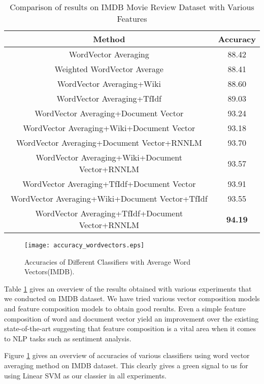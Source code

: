 \begin {table}[H]
\centering
\begin{tabular}{ | c | c | }
\hline
\textbf{Method} & \textbf{Accuracy} \\ \hline
WordVector Averaging & 88.42\\ \hline
Weighted WordVector Average & 88.41\\ \hline
WordVector Averaging+Wiki & 88.60\\ \hline
WordVector Averaging+TfIdf & 89.03\\ \hline
WordVector Averaging+Document Vector & 93.24\\ \hline
WordVector Averaging+Wiki+Document Vector & 93.18\\ \hline
WordVector Averaging+Document Vector+RNNLM & 93.70\\ \hline
WordVector Averaging+Wiki+Document Vector+RNNLM & 93.57\\ \hline
WordVector Averaging+TfIdf+Document Vector & 93.91\\ \hline
WordVector Averaging+Wiki+Document Vector+TfIdf & 93.55\\ \hline
WordVector Averaging+TfIdf+Document Vector+RNNLM & \textbf{94.19}\\ \hline
\end{tabular}
\caption {Comparison of results on IMDB Movie Review Dataset with Various Features}
\label{table:IMDB_features}
\end{table}

\begin{figure}[H]
\centering
\texttt{[image: accuracy\_wordvectors.eps]}
\caption{Accuracies of Different Classifiers with Average Word Vectors(IMDB). \label{fig:accuracy_wordvectors}}
\end{figure}

Table \ref{table:IMDB_features} gives an overview of the results obtained with various experiments that we conducted on IMDB dataset. We have tried various vector composition models and feature composition models to obtain good results. Even a simple feature composition of word and document vector yield an improvement over the existing state-of-the-art suggesting that feature composition is a vital area when it comes to NLP tasks such as sentiment analysis.

Figure \ref{fig:accuracy_wordvectors} gives an overview of accuracies of various classifiers using word vector averaging method on IMDB dataset. This clearly gives a green signal to us for using Linear SVM as our classier in all experiments.



